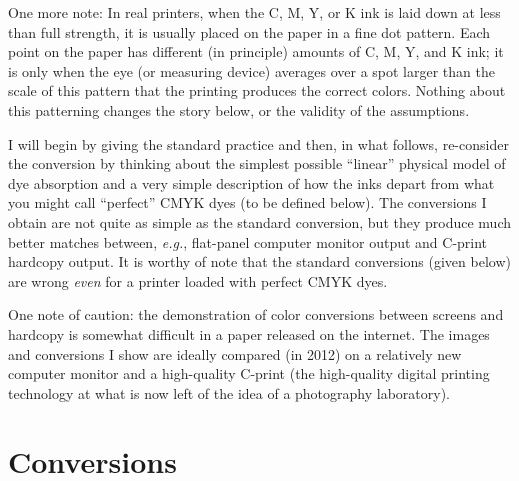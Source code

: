 \documentclass[letterpaper,preprint,dvipdf]{aastex}
\newcommand{\latin}[1]{\textit{#1}}
\newcommand{\eg}{\latin{e.g.}}
\begin{document}
One more note: In real printers, when the C, M, Y, or K ink is laid
down at less than full strength, it is usually placed on the paper in
a fine dot pattern.  Each point on the paper has different (in
principle) amounts of C, M, Y, and K ink; it is only when the eye (or
measuring device) averages over a spot larger than the scale of this
pattern that the printing produces the correct colors.  Nothing about
this patterning changes the story below, or the validity of the
assumptions.

I will begin by giving the standard practice and then, in what
follows, re-consider the conversion by thinking about the simplest
possible ``linear'' physical model of dye absorption and a very simple
description of how the inks depart from what you might call
``perfect'' CMYK dyes (to be defined below).  The conversions I obtain
are not quite as simple as the standard conversion, but they produce
much better matches between, \eg, flat-panel computer monitor output
and C-print hardcopy output.  It is worthy of note that the standard
conversions (given below) are wrong \emph{even} for a printer loaded
with perfect CMYK dyes.

One note of caution: the demonstration of color conversions between
screens and hardcopy is somewhat difficult in a paper released on the
internet.  The images and conversions I show are ideally compared (in
2012) on a relatively new computer monitor and a high-quality C-print
(the high-quality digital printing technology at what is now left of
the idea of a photography laboratory).

\section{Conversions}
\end{document}
